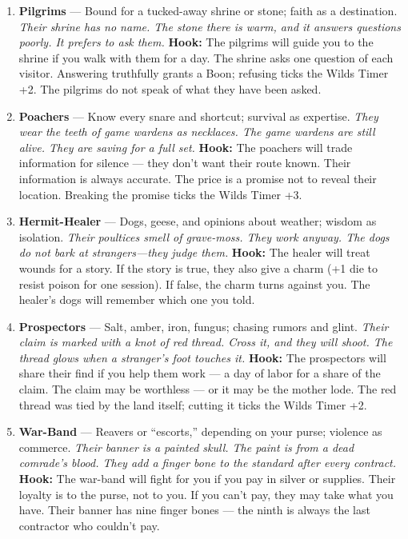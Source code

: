 \begin{enumerate}
\item \textbf{Pilgrims} --- Bound for a tucked-away shrine or stone; faith as a destination.
  \hfill \textit{Their shrine has no name. The stone there is warm, and it answers questions poorly. It prefers to ask them.}
  \textbf{Hook:} The pilgrims will guide you to the shrine if you walk with them for a day. The shrine asks one question of each visitor. Answering truthfully grants a Boon; refusing ticks the Wilds Timer +2. The pilgrims do not speak of what they have been asked.
  
\item \textbf{Poachers} --- Know every snare and shortcut; survival as expertise.
  \hfill \textit{They wear the teeth of game wardens as necklaces. The game wardens are still alive. They are saving for a full set.}
  \textbf{Hook:} The poachers will trade information for silence --- they don't want their route known. Their information is always accurate. The price is a promise not to reveal their location. Breaking the promise ticks the Wilds Timer +3.
  
\item \textbf{Hermit-Healer} --- Dogs, geese, and opinions about weather; wisdom as isolation.
  \hfill \textit{Their poultices smell of grave-moss. They work anyway. The dogs do not bark at strangers---they judge them.}
  \textbf{Hook:} The healer will treat wounds for a story. If the story is true, they also give a charm (+1 die to resist poison for one session). If false, the charm turns against you. The healer's dogs will remember which one you told.
  
\item \textbf{Prospectors} --- Salt, amber, iron, fungus; chasing rumors and glint.
  \hfill \textit{Their claim is marked with a knot of red thread. Cross it, and they will shoot. The thread glows when a stranger's foot touches it.}
  \textbf{Hook:} The prospectors will share their find if you help them work --- a day of labor for a share of the claim. The claim may be worthless --- or it may be the mother lode. The red thread was tied by the land itself; cutting it ticks the Wilds Timer +2.
  
\item \textbf{War-Band} --- Reavers or ``escorts,'' depending on your purse; violence as commerce.
  \hfill \textit{Their banner is a painted skull. The paint is from a dead comrade's blood. They add a finger bone to the standard after every contract.}
  \textbf{Hook:} The war-band will fight for you if you pay in silver or supplies. Their loyalty is to the purse, not to you. If you can't pay, they may take what you have. Their banner has nine finger bones --- the ninth is always the last contractor who couldn't pay.
  

\end{enumerate}
